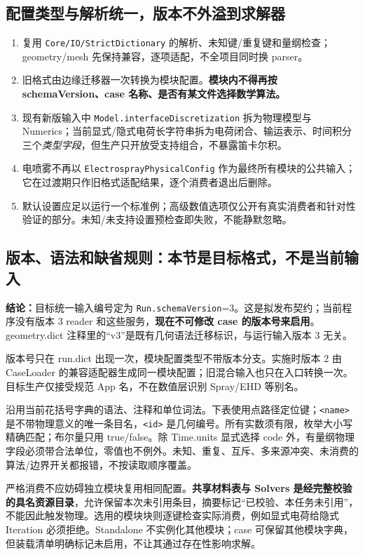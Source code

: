 \documentclass[UTF8,a4paper,11pt,fontset=fandol]{ctexart}
\numberwithin{equation}{section}
\newcommand{\code}[1]{\nolinkurl{#1}}
\newcommand{\decision}[1]{\par\noindent\colorbox{pale}{\parbox{\dimexpr\textwidth-2\fboxsep\relax}{\textbf{结论：}#1}}\par}
\begin{document}
\subsection{配置类型与解析统一，版本不外溢到求解器}
\begin{enumerate}
\item 复用 \code{Core/IO/StrictDictionary} 的解析、未知键/重复键和量纲检查；geometry/mesh 先保持兼容，逐项适配，不全项目同时换 parser。
\item 旧格式由边缘迁移器一次转换为模块配置。\textbf{模块内不得再按 schemaVersion、case 名称、是否有某文件选择数学算法。}
\item 现有新版输入中 \code{Model.interfaceDiscretization} 拆为物理模型与 Numerics；当前显式/隐式电荷长字符串拆为电荷闭合、输运表示、时间积分三个\emph{类型字段}，但生产只开放受支持组合，不暴露笛卡尔积。
\item 电喷雾不再以 \code{ElectrosprayPhysicalConfig} 作为最终所有模块的公共输入；它在过渡期只作旧格式适配结果，逐个消费者退出后删除。
\item 默认设置应足以运行一个标准例；高级数值选项仅公开有真实消费者和针对性验证的部分。未知/未支持设置预检查即失败，不能静默忽略。
\end{enumerate}

\subsection{版本、语法和缺省规则：本节是目标格式，不是当前输入}
\label{sec:dict-contract}
\decision{目标统一输入编号定为 \code{Run.schemaVersion}=3。这是拟发布契约；当前程序没有版本 3 reader 和这些服务，\textbf{现在不可修改 case 的版本号来启用}。geometry.dict 注释里的“v3”是既有几何语法迁移标识，与运行输入版本 3 无关。}
版本号只在 run.dict 出现一次，模块配置类型不带版本分支。实施时版本 2 由 CaseLoader 的兼容适配器生成同一模块配置；旧混合输入也只在入口转换一次。目标生产仅接受规范 App 名，不在数值层识别 Spray/EHD 等别名。

沿用当前花括号字典的语法、注释和单位词法。下表使用点路径定位键；\code{<name>} 是不带物理意义的唯一条目名，\code{<id>} 是几何编号。所有实数须有限，枚举大小写精确匹配；布尔量只用 true/false。除 Time.units 显式选择 code 外，有量纲物理字段必须带合法单位，零值也不例外。未知、重复、互斥、多来源冲突、未消费的算法/边界开关都报错，不按读取顺序覆盖。

严格消费不应妨碍独立模块复用相同配置。\textbf{共享材料表与 Solvers 是经完整校验的具名资源目录}，允许保留本次未引用条目，摘要标记“已校验、本任务未引用”，不能因此触发物理。选用的模块块则逐键检查实际消费，例如显式电荷给隐式 Iteration 必须拒绝。Standalone 不实例化其他模块；case 可保留其他模块字典，但装载清单明确标记未启用，不让其通过存在性影响求解。
\end{document}
